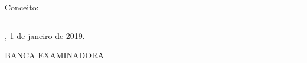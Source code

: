 \documentclass[
	12pt,				%
	openright,			%
	twoside,			%
	a4paper,			%
	english,			%
	brazil				%
	]{abntex2}
\begin{document}



%
% 
%
\begin{folhadeaprovacao}

  \begin{center}
    {\ABNTEXchapterfont\large\imprimirautor}

    \vspace*{\fill}\vspace*{\fill}
    \begin{center}
      \ABNTEXchapterfont\bfseries\Large\imprimirtitulo
    \end{center}
    \vspace*{\fill}
    
    \hspace{.45\textwidth}
    \begin{minipage}{.5\textwidth}
        \imprimirpreambulo
    \end{minipage}%
    \vspace*{\fill}
   \end{center}
        
   Conceito: \rule{3cm}{.1pt}
   
   \imprimirlocal, 1 de janeiro de 2019.
   
   \vspace{1cm}
   \begin{center}
   BANCA EXAMINADORA
   \end{center}
    

      

  
\end{folhadeaprovacao}
\end{document}
